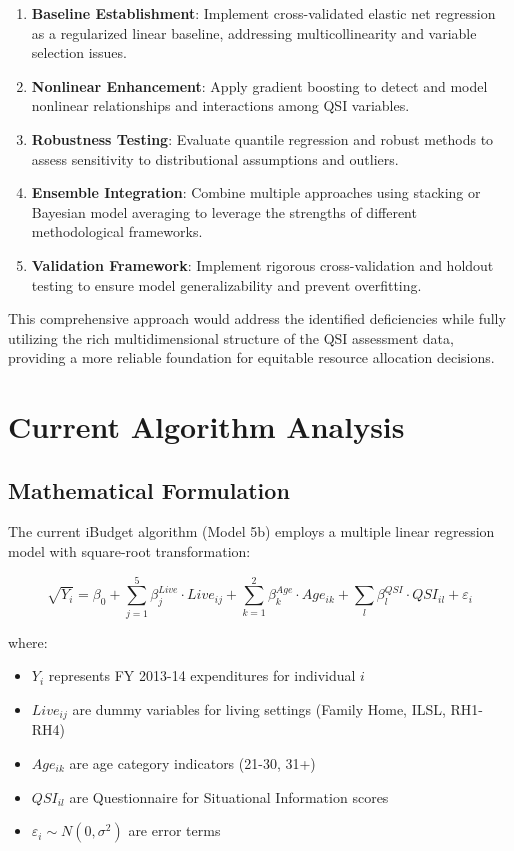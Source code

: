 \begin{enumerate}
    \item \textbf{Baseline Establishment}: Implement cross-validated elastic net regression as a regularized linear baseline, addressing multicollinearity and variable selection issues.
    
    \item \textbf{Nonlinear Enhancement}: Apply gradient boosting to detect and model nonlinear relationships and interactions among QSI variables.
    
    \item \textbf{Robustness Testing}: Evaluate quantile regression and robust methods to assess sensitivity to distributional assumptions and outliers.
    
    \item \textbf{Ensemble Integration}: Combine multiple approaches using stacking or Bayesian model averaging to leverage the strengths of different methodological frameworks.
    
    \item \textbf{Validation Framework}: Implement rigorous cross-validation and holdout testing to ensure model generalizability and prevent overfitting.
\end{enumerate}

This comprehensive approach would address the identified deficiencies while fully utilizing the rich multidimensional structure of the QSI assessment data, providing a more reliable foundation for equitable resource allocation decisions.


\section{Current Algorithm Analysis}

\subsection{Mathematical Formulation}

The current iBudget algorithm (Model 5b) employs a multiple linear regression model with square-root transformation:

\begin{equation}
\sqrt{Y_i} = \beta_0 + \sum_{j=1}^{5} \beta_j^{Live} \cdot Live_{ij} + \sum_{k=1}^{2} \beta_k^{Age} \cdot Age_{ik} + \sum_{l} \beta_l^{QSI} \cdot QSI_{il} + \varepsilon_i
\end{equation}

where:
\begin{itemize}
    \item $Y_i$ represents FY 2013-14 expenditures for individual $i$
    \item $Live_{ij}$ are dummy variables for living settings (Family Home, ILSL, RH1-RH4)
    \item $Age_{ik}$ are age category indicators (21-30, 31+)
    \item $QSI_{il}$ are Questionnaire for Situational Information scores
    \item $\varepsilon_i \sim N(0, \sigma^2)$ are error terms
\end{itemize}

